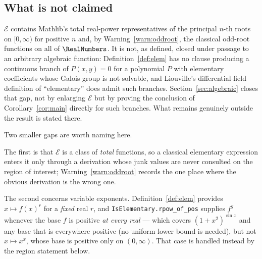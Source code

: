 \documentclass[11pt,oneside]{article}
\theoremstyle{definition}
\theoremstyle{remark}
\newcommand{\Elem}{\mathcal E}
\begin{document}
\subsection{What is not claimed}\label{sec:notclaimed}

$\Elem$ contains Mathlib's total real-power representatives of the principal
$n$-th roots on $[0,\infty)$ for positive $n$ and, by
Warning~\ref{warn:oddroot}, the classical odd-root functions on all of $\RealNumbers$.
It is not, as defined, closed under passage
to an arbitrary algebraic function: Definition~\ref{def:elem} has no clause
producing a continuous branch of $P(x,y)=0$ for a polynomial $P$ with
elementary coefficients whose Galois group is not solvable, and Liouville's
differential-field definition of ``elementary'' does admit such branches.
Section~\ref{sec:algebraic} closes that gap, not by enlarging $\Elem$ but by
proving the conclusion of Corollary~\ref{cor:main} directly for such branches.
What remains genuinely outside the result is stated there.

Two smaller gaps are worth naming here.

The first is that $\Elem$ is a class of \emph{total} functions, so a classical
elementary expression enters it only through a derivation whose junk values
are never consulted on the region of interest; Warning~\ref{warn:oddroot}
records the one place where the obvious derivation is the wrong one.

The second concerns variable exponents.  Definition~\ref{def:elem}
provides $x\mapsto f(x)^r$ for a \emph{fixed} real $r$, and
\texttt{IsElementary.rpow\_of\_pos} supplies $f^g$ whenever the base $f$ is
positive \emph{at every real} --- which covers $(1+x^2)^{\sin x}$ and any base
that is everywhere positive (no uniform lower bound is needed), but not
$x\mapsto x^x$, whose base is positive only on $(0,\infty)$.  That case is
handled instead by the region statement below.
\end{document}
